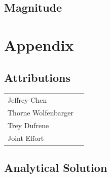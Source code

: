 \documentclass[12pt]{report}
\begin{document}
\begin{flushleft}
\subsection{Magnitude}

\section{Appendix} \label{appendix}
\subsection{Attributions}
\onehalfspacing
\begin{tabular}{ll}
Jeffrey Chen & \\
Thorne Wolfenbarger & \\
Trey Dufrene & \\
Joint Effort &
\end{tabular}
\singlespacing

\newpage
\subsection{Analytical Solution}

\newpage

\end{flushleft}
\end{document}

